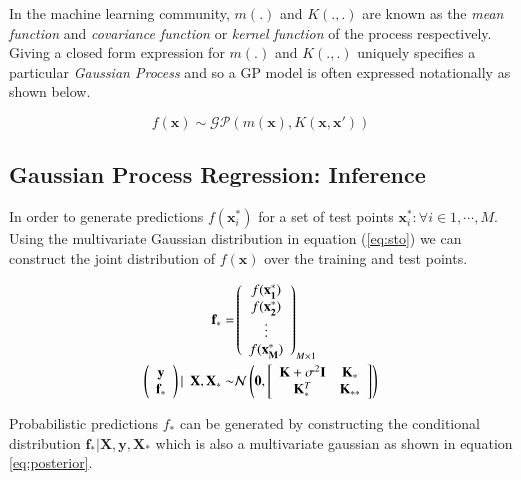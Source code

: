 \documentclass{article}
\begin{document}
In the machine learning community, $m(.)$ and $K(.,.)$ are known as the \emph{mean function} and \emph{covariance function} or \emph{kernel function} of the process respectively. Giving a closed form expression for $m(.)$ and $K(.,.)$ uniquely specifies a particular \emph{Gaussian Process} and so a GP model is often expressed notationally as shown below.

\begin{equation}
    f(\mathbf{x}) \sim \mathcal{GP}(m(\mathbf{x}), K(\mathbf{x}, \mathbf{x}'))
\end{equation}

\subsection{Gaussian Process Regression: Inference}

In order to generate predictions $f(\mathbf{x}^{*}_i)$ for a set of test points $ {\mathbf{x}^{*}_i : \forall i \in 1, \cdots, M} $. Using the multivariate Gaussian distribution in equation (\ref{eq:sto}) we can construct the joint distribution of $f(\mathbf{x})$ over the training and test points.

\begin{align}
    \mathbf{f}_* = & \left( \begin{array}{c} f(\mathbf{x^{*}_1}) \\ f(\mathbf{x^{*}_2}) \\ \vdots \\ f(\mathbf{x^{*}_M}) \end{array} \right)_{M \times 1} \\
     \vspace{4\baselineskip}
    \left( \begin{array}{c} \mathbf{y} \\ \mathbf{f_*} \end{array} \right) | \ \ \mathbf{X}, \mathbf{X}_* \sim & 
    \mathcal{N}\left(\mathbf{0}, \left[ \begin{array}{cc} \mathbf{K} + \sigma^{2} \mathbf{I} & \mathbf{K}_{*} \\ \mathbf{K}_{*}^T & \mathbf{K}_{**} \end{array} \right ] \right) \label{eq:dist}
\end{align}

Probabilistic predictions $f_*$ can be generated by constructing the conditional distribution $\mathbf{f_*}|\mathbf{X},\mathbf{y},\mathbf{X_*}$ which is also a multivariate gaussian as shown in equation \ref{eq:posterior}.
\end{document}
